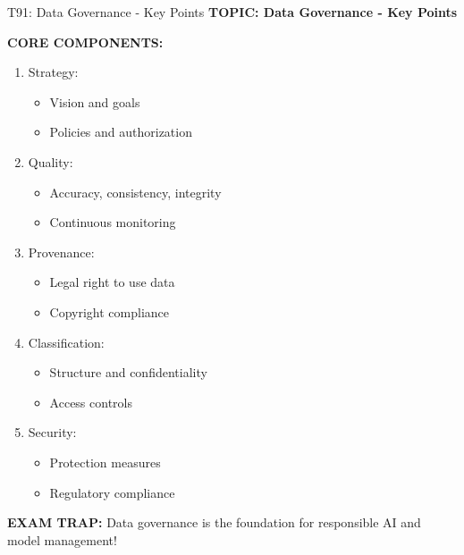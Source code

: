 \documentclass[8pt]{beamer}
\begin{document}
	\begin{frame}{T91: Data Governance - Key Points}
		\fontsize{6.5}{7.5}\selectfont
		\textbf{TOPIC: Data Governance - Key Points}
		
		\vspace{0.1cm}
		\textbf{CORE COMPONENTS:}
		\begin{enumerate}
			\item \textcolor{myblue}{Strategy:}
			\begin{itemize}
				\item Vision and goals
				\item Policies and authorization
			\end{itemize}
			\item \textcolor{myblue}{Quality:}
			\begin{itemize}
				\item Accuracy, consistency, integrity
				\item Continuous monitoring
			\end{itemize}
			\item \textcolor{myblue}{Provenance:}
			\begin{itemize}
				\item Legal right to use data
				\item Copyright compliance
			\end{itemize}
			\item \textcolor{myblue}{Classification:}
			\begin{itemize}
				\item Structure and confidentiality
				\item Access controls
			\end{itemize}
			\item \textcolor{myblue}{Security:}
			\begin{itemize}
				\item Protection measures
				\item Regulatory compliance
			\end{itemize}
		\end{enumerate}
		
		\textcolor{myred}{\textbf{EXAM TRAP:}} Data governance is the \textcolor{myblue}{foundation for responsible AI and model management}!
	\end{frame}
	
\end{document}
